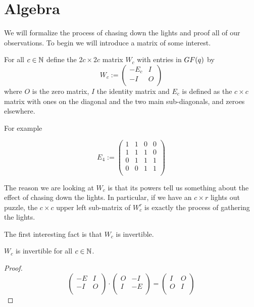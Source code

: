\section{Algebra}
We will formalize the process of chasing down the lights and proof all of our
observations. To begin we will introduce a matrix of some interest.

For all $c\in\mathbb{N}$ define the $2c\times 2c$ matrix $W_{c}$ with entries in
$GF(q)$ by
\[
W_{c} := \left(
\begin{array}{cc}
  -E_{c} & I \\
  -I    & O \\
\end{array}
\right)
\]
where $O$ is the zero matrix, $I$ the identity matrix and $E_{c}$ is defined
as the $c\times c$ matrix with ones on the diagonal and the two main
sub-diagonals, and zeroes elsewhere.

For example

\[
E_{4} := \left(
\begin{array}{cccc}
  1 & 1 & 0 & 0 \\
  1 & 1 & 1 & 0 \\
  0 & 1 & 1 & 1 \\
  0 & 0 & 1 & 1 \\
\end{array}
\right)
\]

The reason we are looking at $W_{c}$ is that its powers tell us something about
the effect of chasing down the lights. In particular, if we have an $c \times r$
lights out puzzle, the $c \times c$ upper left sub-matrix of $W_{c}^{r}$ is
exactly the process of gathering the lights.

The first interesting fact is that $W_{c}$ is invertible.

\begin{lemma}
  $W_{c}$ is invertible for all $c\in\mathbb{N}$.
\end{lemma}

\begin{proof}
  \[
  \left(
  \begin{array}{cc}
    -E & I \\
    -I & O \\
  \end{array}
  \right)
  \cdot
  \left(
  \begin{array}{cc}
    O & -I  \\
    I & -E \\
  \end{array}
  \right)
  =
  \left(
  \begin{array}{cc}
    I & O \\
    O & I \\
  \end{array}
  \right)
  \]
\end{proof}

